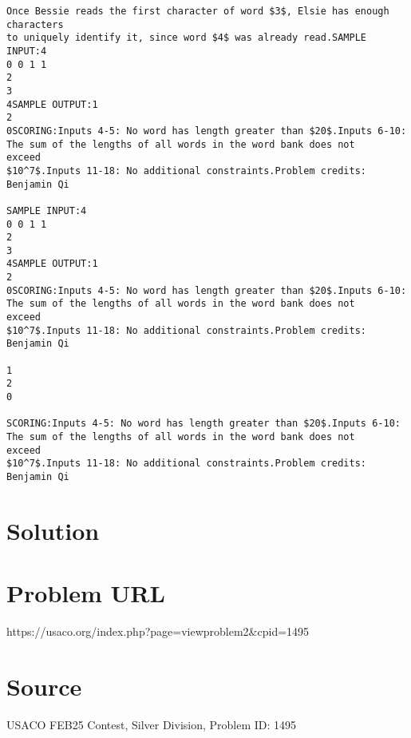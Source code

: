 \documentclass[12pt]{article}
\begin{document}
\begin{verbatim}
Once Bessie reads the first character of word $3$, Elsie has enough characters
to uniquely identify it, since word $4$ was already read.SAMPLE INPUT:4
0 0 1 1
2
3
4SAMPLE OUTPUT:1
2
0SCORING:Inputs 4-5: No word has length greater than $20$.Inputs 6-10: The sum of the lengths of all words in the word bank does not
exceed
$10^7$.Inputs 11-18: No additional constraints.Problem credits: Benjamin Qi

SAMPLE INPUT:4
0 0 1 1
2
3
4SAMPLE OUTPUT:1
2
0SCORING:Inputs 4-5: No word has length greater than $20$.Inputs 6-10: The sum of the lengths of all words in the word bank does not
exceed
$10^7$.Inputs 11-18: No additional constraints.Problem credits: Benjamin Qi

1
2
0

SCORING:Inputs 4-5: No word has length greater than $20$.Inputs 6-10: The sum of the lengths of all words in the word bank does not
exceed
$10^7$.Inputs 11-18: No additional constraints.Problem credits: Benjamin Qi
\end{verbatim}

\section*{Solution}


\section*{Problem URL}
https://usaco.org/index.php?page=viewproblem2&cpid=1495

\section*{Source}
USACO FEB25 Contest, Silver Division, Problem ID: 1495
\end{document}

